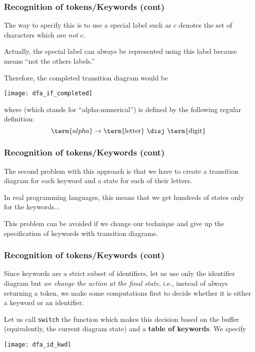 % 
\begin{frame}
\frametitle{Recognition of tokens/Keywords (cont)}

The way to specify this is to use a special label \compl such
as \compl \(c\) denotes the set of characters which
are \emph{not} \(c\).

\bigskip

Actually, the special label \other can always be represented using
this \compl label because \other means ``not the others labels.''

\bigskip

Therefore, the completed  transition diagram would be
\begin{center}
\texttt{[image: dfa\_if\_completed]}
\end{center}
where  (which stands for ``alpha-numerical'') is defined by
the following regular definition:
\[
\term{alpha} \rightarrow \text{\term{letter} \disj \term{digit}}
\]

\end{frame}

% 
\begin{frame}
\frametitle{Recognition of tokens/Keywords (cont)}

The second problem with this approach is that we have to create a
transition diagram for each keyword and a state for each of their
letters.

\bigskip

In real programming languages, this means that we get hundreds of
states only for the keywords...

\bigskip

This problem can be avoided if we change our technique and give up
the specification of keywords with transition diagrams.

\end{frame}

% 
\begin{frame}
\frametitle{Recognition of tokens/Keywords (cont)}

Since keywords are a strict subset of identifiers, let us use only the
identifier diagram but \emph{we change the action at the final state},
i.e., instead of always returning a  token, we make some
computations first to decide whether it is either a keyword or an
identifier.

\bigskip

Let us call \texttt{switch} the function which makes this decision
based on the buffer (equivalently, the current diagram state) and
a \textbf{table of keywords}. We specify
\begin{center}
\texttt{[image: dfa\_id\_kwd]}
\end{center}
 
\end{frame}

